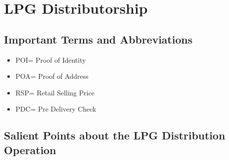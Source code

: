 \documentclass{report}
\begin{document}
	\chapter{LPG Distributorship}
	\section{Important Terms and Abbreviations}
	\begin{itemize}
		\item POI= Proof of Identity
		\item POA= Proof of Address
		\item RSP= Retail Selling Price
		\item PDC= Pre Delivery Check
	\end{itemize}
	\section{Salient Points about the LPG Distribution Operation}
\end{document}
